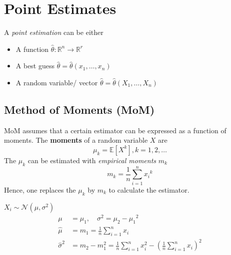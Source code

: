 \section{Point Estimates}
A \textit{point estimation} can be either
\begin{itemize}
    \item A function $\widehat{\theta}: \mathbb{R}^n\to \mathbb{R}^r$
    \item A best guess $\widehat{\theta} = \widehat{\theta}(x_1,\ldots, x_n)$
    \item A random variable/ vector $\widehat{\theta} = \widehat{\theta}(X_1,\ldots, X_n)$
\end{itemize}

\subsection{Method of Moments (MoM)}
MoM assumes that a certain estimator can be expressed as a function of moments.
The \textbf{moments} of a random variable $X$ are
\noindent\begin{equation*}
    \mu_k=\mathbb{E}[X^k],k=1,2,\ldots
\end{equation*}
The $\mu_k$ can be estimated with \textit{empirical moments} $m_k$
\noindent\begin{equation*}
    m_k=\frac{1}{n}\sum_{i=1}^n {x_i}^k
\end{equation*}
Hence, one replaces the $\mu_k$ by $m_k$ to calculate the estimator.

\begin{examplesection}

    $X_i \sim \mathcal{N}(\mu,\sigma^2)$
    \noindent\begin{align*}
        \mu            & = \mu_1, \quad \sigma^2 = \mu_2-{\mu_1}^2                                             \\
        \widehat{\mu}      & =m_1=\frac{1}{n}\sum_{i=1}^n x_i                                                      \\
        \widehat{\sigma}^2 & =m_2-m_1^2=\frac{1}{n}\sum_{i=1}^n x_i^2-{\left(\frac{1}{n}\sum_{i=1}^n x_i\right)}^2
    \end{align*}
\end{examplesection}

